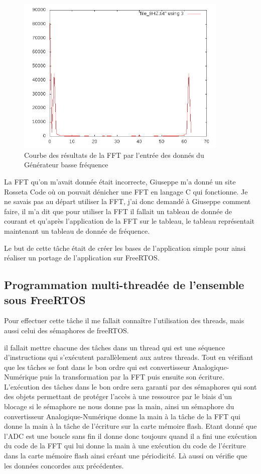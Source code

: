 \documentclass[a4paper]{article}
\begin{document}
\begin{figure}[H]
\centering
\includegraphics[width=0.9\textwidth]{output8HZ.png}
\caption{\label{fig:mesureDeSortie}Courbe des résultats de la FFT par l'entrée des donnés du Générateur basse fréquence}
\end{figure}

La FFT qu'on m'avait donnée était incorrecte, Giuseppe m'a donné un site Rosseta Code où on pouvait dénicher une FFT en langage C qui fonctionne. Je ne savais pas au départ utiliser la FFT, j'ai donc demandé à Giuseppe comment faire, il m'a dit que pour utiliser la FFT il fallait un tableau de donnée de courant et qu'après l'application de la FFT sur le tableau, le tableau représentait maintenant un tableau de donnée de fréquence.

Le but de cette tâche était de créer les bases de l'application simple pour ainsi réaliser un portage de l'application sur FreeRTOS. 

\subsection{ Programmation multi-threadée de l'ensemble sous FreeRTOS}

Pour effectuer cette tâche il me fallait connaître l'utilisation des threads, mais aussi celui des sémaphores de freeRTOS. 

il fallait mettre chacune des tâches dans un thread qui est une séquence d'instructions qui s'exécutent parallèlement aux autres threads. Tout en vérifiant que les tâches se font dans le bon ordre qui est convertisseur Analogique-Numérique puis la transformation par la FFT puis ensuite son écriture. L'exécution des tâches dans le bon ordre sera garanti par des sémaphores qui sont des objets permettant de protéger l'accès à une ressource par le biais d'un blocage si le sémaphore ne nous donne pas la main, ainsi un sémaphore du convertisseur Analogique-Numérique donne la main à la tâche de la FFT qui donne la main à la tâche de l'écriture sur la carte mémoire flash. Etant donné que l'ADC est une boucle sans fin il donne donc toujours quand il a fini une exécution du code de la FFT qui lui donne la main à une exécution du code de l'écriture dans la carte mémoire flash ainsi créant une périodicité. Là aussi on vérifie que les données concordes aux précédentes.
\end{document}
